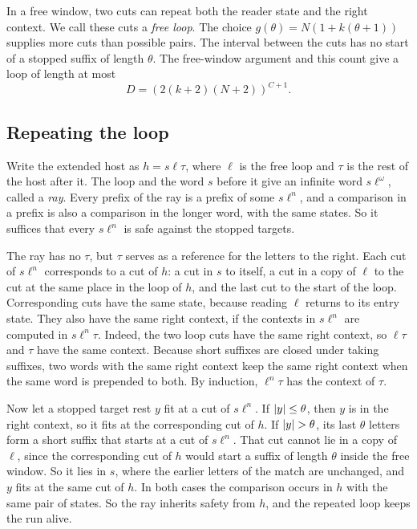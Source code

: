 In a free window, two cuts can repeat both the reader state and the
right context. We call these cuts a \emph{free loop}. The choice
$g(\theta)=N(1+k(\theta+1))$ supplies more cuts than possible pairs. The
interval between the cuts has no start of a stopped suffix of length
$\theta$. The free-window argument and this count give a loop of length at
most
\begin{equation}
 D=(2(k+2)(N+2))^{C+1}.
 \label{eq:period-bound}
\end{equation}

\subsection{Repeating the loop}

Write the extended host as $h=s\ell\tau$, where $\ell$ is the free loop
and $\tau$ is the rest of the host after it. The loop and the word $s$
before it give an infinite word $s\ell^\omega$, called a \emph{ray}. Every
prefix of the ray is a prefix of some $s\ell^n$, and a comparison in a
prefix is also a comparison in the longer word, with the same states. So
it suffices that every $s\ell^n$ is safe against the stopped targets.

The ray has no $\tau$, but $\tau$ serves as a reference for the letters
to the right. Each cut of $s\ell^n$ corresponds to a cut of $h$: a cut in
$s$ to itself, a cut in a copy of $\ell$ to the cut at the same place in
the loop of $h$, and the last cut to the start of the loop. Corresponding cuts have the same state, because
reading $\ell$ returns to its entry state. They also have the same right
context, if the contexts in $s\ell^n$ are computed in $s\ell^n\tau$.
Indeed, the two loop cuts have the same right context, so $\ell\tau$ and
$\tau$ have the same context. Because short suffixes are closed under
taking suffixes, two words with the same right context keep the same
right context when the same word is prepended to both. By induction,
$\ell^n\tau$ has the context of $\tau$.

Now let a stopped target rest $y$ fit at a cut of $s\ell^n$. If
$\lvert y\rvert\le\theta$, then $y$ is in the right context, so it fits at the
corresponding cut of $h$. If $\lvert y\rvert>\theta$, its last $\theta$ letters
form a short suffix that starts at a cut of $s\ell^n$. That cut cannot lie
in a copy of $\ell$, since the corresponding cut of $h$ would start a
suffix of length $\theta$ inside the free window. So it lies in $s$, where
the earlier letters of the match are unchanged, and $y$ fits at the same
cut of $h$. In both cases the comparison occurs in $h$ with the same pair
of states. So the ray inherits safety from $h$, and the repeated loop keeps
the run alive.

